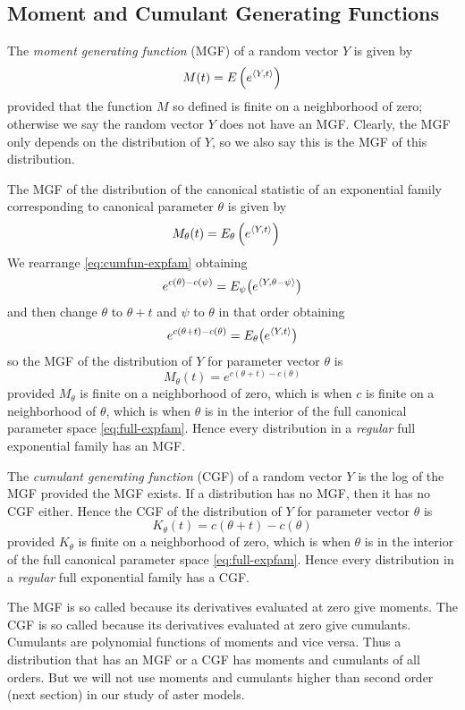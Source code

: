 \subsection{Moment and Cumulant Generating Functions}

The \emph{moment generating function} (MGF) of a random vector $Y$ is given by
$$
   M(t) = E\left(e^{\langle Y, t \rangle}\right)
$$
provided that the function $M$ so defined is finite on a neighborhood of
zero; otherwise we say the random vector $Y$ does not have an MGF.
Clearly, the MGF only depends on the distribution of $Y$,
so we also say this is the MGF of this distribution.

The MGF of the distribution of the canonical statistic of an exponential
family corresponding to canonical parameter $\theta$ is given by
\begin{align*}
   M_\theta(t)
   & =
   E_\theta\left(e^{\langle Y, t \rangle}\right)
\end{align*}
We rearrange \eqref{eq:cumfun-expfam} obtaining
$$
   e^{c(\theta) - c(\psi)}
   =
   E_\psi\bigl( e^{\langle Y, \theta - \psi \rangle} \bigr)
$$
and then change $\theta$ to $\theta + t$ and $\psi$ to $\theta$ in that order
obtaining
$$
   e^{c(\theta + t) - c(\theta)}
   =
   E_\theta\bigl( e^{\langle Y, t \rangle} \bigr)
$$
so the MGF of the distribution of $Y$ for parameter vector $\theta$ is
$$
   M_\theta(t)
   =
   e^{c(\theta + t) - c(\theta)}
$$
provided $M_\theta$ is finite on a neighborhood of zero,
which is when $c$ is finite on a neighborhood of $\theta$,
which is when $\theta$ is in the interior of the full canonical
parameter space \eqref{eq:full-expfam}.
Hence every distribution in a \emph{regular} full exponential
family has an MGF.

The \emph{cumulant generating function} (CGF) of a random vector $Y$ is
the log of the MGF provided the MGF exists.
If a distribution has no MGF, then it has no CGF either.
Hence the CGF of the distribution of $Y$ for parameter vector $\theta$ is
$$
   K_\theta(t)
   =
   c(\theta + t) - c(\theta)
$$
provided $K_\theta$ is finite on a neighborhood of zero,
which is when $\theta$ is in the interior of the full canonical
parameter space \eqref{eq:full-expfam}.
Hence every distribution in a \emph{regular} full exponential
family has a CGF.

The MGF is so called because its derivatives evaluated at zero give moments.
The CGF is so called because its derivatives evaluated at zero give cumulants.
Cumulants are polynomial functions of moments and vice versa.
Thus a distribution that has an MGF or a CGF has moments and cumulants of
all orders.
But we will not use moments and cumulants higher than second order
(next section) in our study of aster models.

